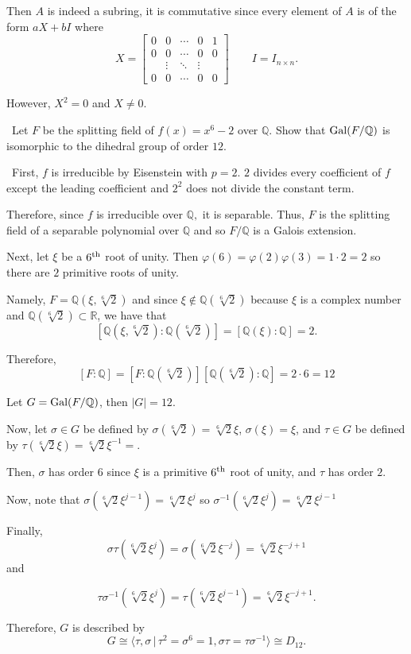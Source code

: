 \documentclass[12pt]{AlgebraQual}
\begin{document}
\begin{solution}
Then $A$ is indeed a subring, it is commutative since every element of $A$ is of the form $aX+bI$ where $$X=\begin{bmatrix}
0 & 0 & \cdots & 0 & 1 \\
0 & 0  &\cdots & 0 & 0\\
& \vdots &\ddots & \vdots & \\
0 & 0 &\cdots & 0 & 0
\end{bmatrix}\qquad I=I_{n\times n}.$$

However, $X^2=0$ and $X\not=0.$
\end{solution}
\newpage



\begin{problem} $\,$
Let $F$ be the splitting field of $f(x)=x^6-2$ over $\mathbb{Q}$. Show that $\text{Gal}(F/\mathbb{Q})$ is isomorphic to the dihedral group of order $12.$
\end{problem}


\begin{solution}$\,$
First, $f$ is irreducible by Eisenstein with $p=2$. $2$ divides every coefficient of $f$ except the leading coefficient and $2^2$ does not divide the constant term.

Therefore, since $f$ is irreducible over $\mathbb{Q},$ it is separable. Thus, $F$ is the splitting field of a separable polynomial over $\mathbb{Q}$ and so $F/\mathbb{Q}$ is a Galois extension.

Next, let $\xi$ be a $6^\text{th}$ root of unity. Then $\varphi(6)=\varphi(2)\varphi(3)=1\cdot 2=2$ so there are $2$ primitive roots of unity.

Namely, $F=\mathbb{Q}(\xi,\sqrt[6]{2})$ and since $\xi\notin\mathbb{Q}(\sqrt[6]{2})$ because $\xi$ is a complex number and $\mathbb{Q}(\sqrt[6]{2})\subset\mathbb{R}$, we have that $$[\mathbb{Q}(\xi,\sqrt[6]{2}):\mathbb{Q}(\sqrt[6]{2})]=[\mathbb{Q}(\xi):\mathbb{Q}]=2.$$

Therefore, $$[F:\mathbb{Q}]=[F:\mathbb{Q}(\sqrt[6]{2})][\mathbb{Q}(\sqrt[6]{2}):\mathbb{Q}]=2\cdot 6=12$$

Let $G=\text{Gal}(F/\mathbb{Q})$, then $|G|=12$.

Now, let $\sigma\in G$ be defined by $\sigma(\sqrt[6]{2})=\sqrt[6]{2}\xi$, $\sigma(\xi)=\xi$, and $\tau\in G$ be defined by $\tau(\sqrt[6]{2}\xi)=\sqrt[6]{2}\xi^{-1}=$.

Then, $\sigma$ has order $6$ since $\xi$ is a primitive $6^\text{th}$ root of unity, and $\tau$ has order $2$.

Now, note that $\sigma(\sqrt[6]{2}\xi^{j-1})=\sqrt[6]{2}\xi^j$ so $\sigma^{-1}(\sqrt[6]{2}\xi^j)=\sqrt[6]{2}\xi^{j-1}$

Finally, $$\sigma\tau(\sqrt[6]{2}\xi^j)=\sigma(\sqrt[6]{2}\xi^{-j})=\sqrt[6]{2}\xi^{-j+1}$$ and

$$\tau\sigma^{-1}(\sqrt[6]{2}\xi^j)=\tau(\sqrt[6]{2}\xi^{j-1})=\sqrt[6]{2}\xi^{-j+1}.$$

Therefore, $G$ is described by $$G\cong \langle \tau,\sigma\,|\,\tau^2=\sigma^6=1,\sigma\tau=\tau\sigma^{-1}\rangle\cong D_{12}.$$
\end{solution}
\newpage
\end{document}
